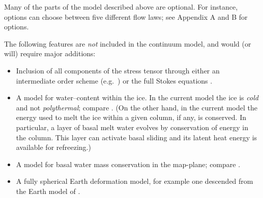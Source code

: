 \documentclass[11pt,final]{amsart}
\begin{document}
Many of the parts of the model described above are optional.  For instance, options can choose between five different flow laws; see Appendix A and B for options.

The following features are \emph{not} included in the continuum model, and would (or will) require major additions:
\begin{itemize}
\item Inclusion of all components of the stress tensor through either an intermediate order scheme (e.g.~\cite{Blatter,Hindmarsh06,Pattyn03}) or the full Stokes equations \cite{Fowler}.
\item A model for water--content within the ice.  In the current model the ice is \emph{cold} and not \emph{polythermal}; compare \cite{Greve}.  (On the other hand, in the current model the energy used to melt the ice within a given column, if any, is conserved.  In particular, a layer of basal melt water evolves by conservation of energy in the column.  This layer can activate basal sliding and its latent heat energy is available for refreezing.)
\item A model for basal water mass conservation in the map-plane; compare \cite{JohnsonFastook}.
\item A fully spherical Earth deformation model, for example one descended from the Earth model of \cite{Peltier}.
\end{itemize}
\end{document}

